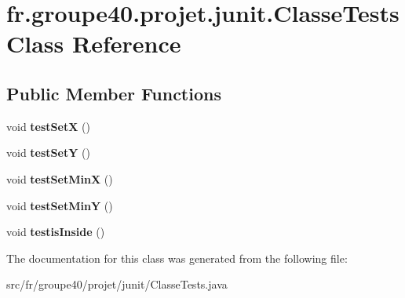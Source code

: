 \hypertarget{classfr_1_1groupe40_1_1projet_1_1junit_1_1_classe_tests}{}\section{fr.\+groupe40.\+projet.\+junit.\+Classe\+Tests Class Reference}
\label{classfr_1_1groupe40_1_1projet_1_1junit_1_1_classe_tests}
\subsection*{Public Member Functions}
\begin{DoxyCompactItemize}
\item 
\mbox{\label{classfr_1_1groupe40_1_1projet_1_1junit_1_1_classe_tests_aba4119c402db01fd40a19fd4e6a2a255}} 
void {\bfseries test\+SetX} ()
\item 
\mbox{\label{classfr_1_1groupe40_1_1projet_1_1junit_1_1_classe_tests_a7ce3238d94a1f88707168cb2050236d1}} 
void {\bfseries test\+SetY} ()
\item 
\mbox{\label{classfr_1_1groupe40_1_1projet_1_1junit_1_1_classe_tests_ab1e1c93b0714105e0a2b935fd1890d2a}} 
void {\bfseries test\+Set\+MinX} ()
\item 
\mbox{\label{classfr_1_1groupe40_1_1projet_1_1junit_1_1_classe_tests_a9cdcb6e7fb788785c16e81df491bada7}} 
void {\bfseries test\+Set\+MinY} ()
\item 
\mbox{\label{classfr_1_1groupe40_1_1projet_1_1junit_1_1_classe_tests_ad70b9d5c654a59dcc3f9794c65930ae8}} 
void {\bfseries testis\+Inside} ()
\end{DoxyCompactItemize}


The documentation for this class was generated from the following file\+:\begin{DoxyCompactItemize}
\item 
src/fr/groupe40/projet/junit/Classe\+Tests.\+java\end{DoxyCompactItemize}
